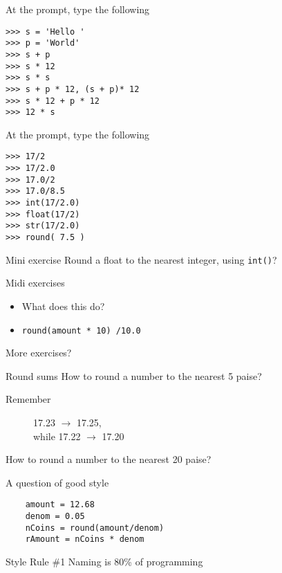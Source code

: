 \documentclass[14pt,compress]{beamer}
\begin{document}
\begin{frame}[fragile]{At the prompt, type the following}
   \begin{lstlisting}
>>> s = 'Hello '
>>> p = 'World'
>>> s + p 
>>> s * 12 
>>> s * s
>>> s + p * 12, (s + p)* 12
>>> s * 12 + p * 12
>>> 12 * s 
    \end{lstlisting}
\end{frame}

\begin{frame}[fragile]{At the prompt, type the following}
  \begin{lstlisting}
>>> 17/2
>>> 17/2.0
>>> 17.0/2
>>> 17.0/8.5
>>> int(17/2.0)
>>> float(17/2)
>>> str(17/2.0)
>>> round( 7.5 )
  \end{lstlisting}
  \begin{block}{Mini exercise}
	Round a float to the nearest integer, using \texttt{int()}?
  \end{block}
\end{frame}

\begin{frame}{Midi exercises}
  \begin{center}
    \begin{itemize}
      \item What does this do?
      \item \texttt{round(amount * 10) /10.0 }
    \end{itemize}
  \end{center}
\end{frame}

\begin{frame}{More exercises?}
  \begin{center}
    \begin{block}{Round sums}
      How to round a number to the nearest  5 paise?\\
      \begin{description}
        \item[Remember] 17.23 $\rightarrow$ 17.25,\\ while 17.22 $\rightarrow$ 17.20\\
      \end{description}
      How to round a number to the nearest 20 paise?
    \end{block}
  \end{center}
\end{frame}

\begin{frame}[fragile] {A question of good style}
  \begin{lstlisting}
    amount = 12.68
    denom = 0.05
    nCoins = round(amount/denom)
    rAmount = nCoins * denom
  \end{lstlisting}
  \pause
  \begin{block}{Style Rule \#1}
    Naming is 80\% of programming
  \end{block}
\end{frame}
\end{document}
